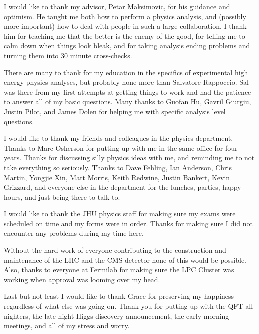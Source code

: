 \begin{frontmatter}
\begin{acknowledgment}
I would like to thank my advisor, Petar Maksimovic, for his guidance and optimism.  
He taught me both how to perform a physics analysis, and (possibly more important) how to deal with people in such a large collaboration.   
I thank him for teaching me that the better is the enemy of the good, for telling me to calm down when things look bleak, and for taking analysis ending problems and turning them into 30 minute cross-checks.  

There are many to thank for my education in the specifics of experimental high energy physics analyses, but probably none more than Salvatore Rappoccio.  
Sal was there from my first attempts at getting things to work and had the patience to answer all of my basic questions.  
Many thanks to Guofan Hu, Gavril Giurgiu, Justin Pilot, and James Dolen for helping me with specific analysis level questions. 

I would like to thank my friends and colleagues in the physics department.  
Thanks to Marc Osherson for putting up with me in the same office for four years.  
Thanks for discussing silly physics ideas with me, and reminding me to not take everything so seriously.  
Thanks to Dave Fehling, Ian Anderson, Chris Martin, Yongjie Xin, Matt Morris, Keith Redwine, Justin Bankert, Kevin Grizzard, 
and everyone else in the department for the lunches, parties, happy hours, and just being there to talk to.  

I would like to thank the JHU physics staff for making sure my exams were scheduled on time and my forms were in order.  
Thanks for making sure I did not encounter any problems during my time here.  

Without the hard work of everyone contributing to the construction and maintenance of the LHC and the CMS detector none of this would be possible.  
Also, thanks to everyone at Fermilab for making sure the LPC Cluster was working when approval was looming over my head.  

Last but not least  I would like to thank Grace for preserving my happiness regardless of what else was going on.  
Thank you for putting up with the QFT all-nighters, the late night Higgs discovery announcement, the early morning meetings, and all of my stress and worry.  

\end{acknowledgment}



\tableofcontents

\listoftables

\listoffigures

\end{frontmatter}

